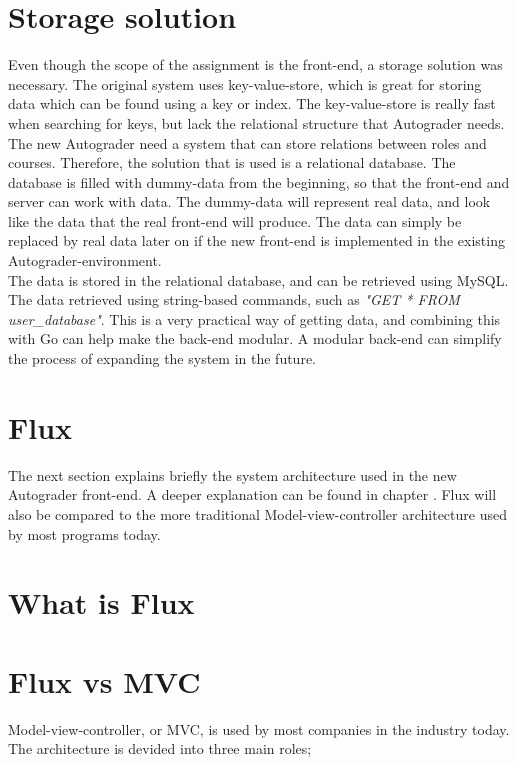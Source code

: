 \section{Storage solution}
Even though the scope of the assignment is the front-end, a storage solution was necessary. The original system uses key-value-store, which is great for storing data which can be found using a key or index. The key-value-store is really fast when searching for keys, but lack the relational structure that Autograder needs. The new Autograder need a system that can store relations between roles and courses. Therefore, the solution that is used is a relational database. The database is filled with dummy-data from the beginning, so that the front-end and server can work with data. The dummy-data will represent real data, and look like the data that the real front-end will produce. The data can simply be replaced by real data later on if the new front-end is implemented in the existing Autograder-environment. \\The data is stored in the relational database, and can be retrieved using MySQL. The data retrieved using string-based commands, such as \emph{"GET * FROM user\_database"}. This is a very practical way of getting data, and combining this with Go can help make the back-end modular. A modular back-end can simplify the process of expanding the system in the future.

\section{Flux}


The next section explains briefly the system architecture used in the new Autograder front-end. A deeper explanation can be found in chapter .  
 Flux will also be compared to the more traditional Model-view-controller architecture used by most programs today.

\section{What is Flux}







\section{Flux vs MVC}
Model-view-controller, or MVC, is used by most companies in the industry today. The architecture is devided into three main roles;

